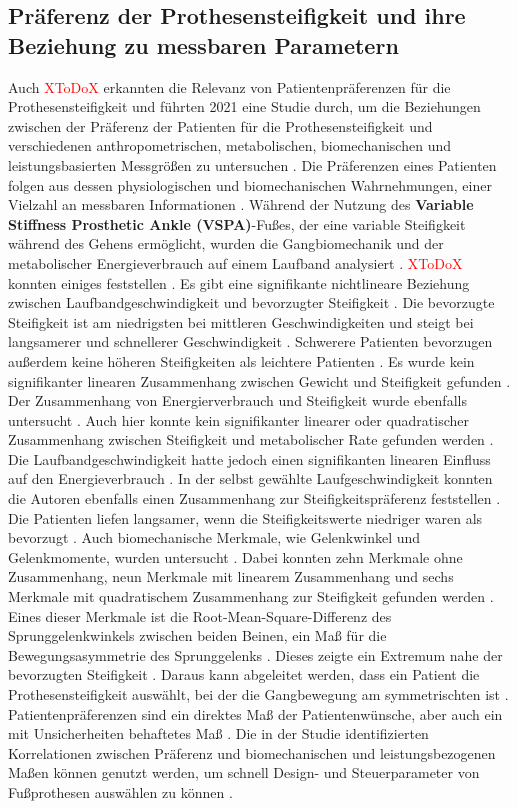 \subsection{Präferenz der Prothesensteifigkeit und ihre Beziehung zu messbaren Parametern}
Auch \textcolor{red}{XToDoX} erkannten die Relevanz von Patientenpräferenzen für die Prothesensteifigkeit und führten 2021 eine Studie durch, um die Beziehungen zwischen der Präferenz der Patienten für die Prothesensteifigkeit und verschiedenen anthropometrischen, metabolischen, biomechanischen und leistungsbasierten Messgrößen zu untersuchen \cite{Clites.2021}. Die Präferenzen eines Patienten folgen aus dessen physiologischen und biomechanischen Wahrnehmungen, einer Vielzahl an messbaren Informationen \cite{Clites.2021}.
Während der Nutzung des \textbf{Variable Stiffness Prosthetic Ankle (VSPA)}-Fußes, der eine variable Steifigkeit während des Gehens ermöglicht, wurden die Gangbiomechanik und der metabolischer Energieverbrauch auf einem Laufband analysiert \cite{Clites.2021}. \textcolor{red}{XToDoX} konnten einiges feststellen \cite{Clites.2021}. 
Es gibt eine signifikante nichtlineare Beziehung zwischen Laufbandgeschwindigkeit und bevorzugter Steifigkeit \cite{Clites.2021}. Die bevorzugte Steifigkeit ist am niedrigsten bei mittleren Geschwindigkeiten und steigt bei langsamerer und schnellerer Geschwindigkeit \cite{Clites.2021}. 
Schwerere Patienten bevorzugen außerdem keine höheren Steifigkeiten als leichtere Patienten \cite{Clites.2021}.
Es wurde kein signifikanter linearen Zusammenhang zwischen Gewicht und Steifigkeit gefunden \cite{Clites.2021}. 
Der Zusammenhang von Energierverbrauch und Steifigkeit wurde ebenfalls untersucht \cite{Clites.2021}. Auch hier konnte kein signifikanter linearer oder quadratischer Zusammenhang zwischen Steifigkeit und metabolischer Rate gefunden werden \cite{Clites.2021}. Die Laufbandgeschwindigkeit hatte jedoch einen signifikanten linearen Einfluss auf den Energieverbrauch \cite{Clites.2021}.
In der selbst gewählte Laufgeschwindigkeit konnten die Autoren ebenfalls einen Zusammenhang zur Steifigkeitspräferenz feststellen \cite{Clites.2021}. Die Patienten liefen langsamer, wenn die Steifigkeitswerte niedriger waren als bevorzugt \cite{Clites.2021}.
Auch biomechanische Merkmale, wie Gelenkwinkel und Gelenkmomente, wurden untersucht \cite{Clites.2021}. Dabei konnten zehn Merkmale ohne Zusammenhang, neun Merkmale mit linearem Zusammenhang und sechs Merkmale mit quadratischem Zusammenhang zur Steifigkeit gefunden werden \cite{Clites.2021}. Eines dieser Merkmale ist die Root-Mean-Square-Differenz des Sprunggelenkwinkels zwischen beiden Beinen, ein Maß für die Bewegungsasymmetrie des Sprunggelenks \cite{Clites.2021}. Dieses zeigte ein Extremum nahe der bevorzugten Steifigkeit \cite{Clites.2021}.
Daraus kann abgeleitet werden, dass ein Patient die Prothesensteifigkeit auswählt, bei der die Gangbewegung am symmetrischten ist \cite{Clites.2021}.
Patientenpräferenzen sind ein direktes Maß der Patientenwünsche, aber auch ein mit Unsicherheiten behaftetes Maß \cite{Clites.2021}. Die in der Studie identifizierten Korrelationen zwischen Präferenz und biomechanischen und leistungsbezogenen Maßen können genutzt werden, um schnell Design- und Steuerparameter von Fußprothesen auswählen zu können \cite{Clites.2021}.

